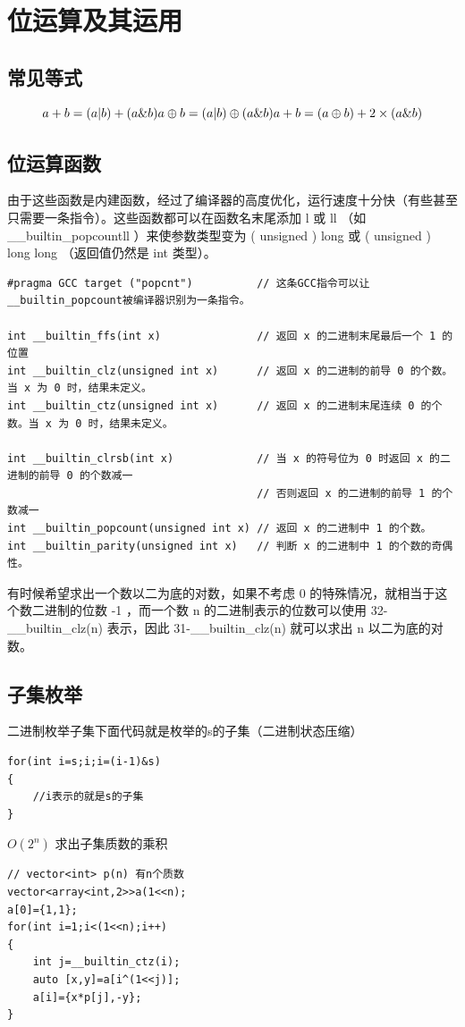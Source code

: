 \section{位运算及其运用}
\subsection{常见等式}
$$
a+b=(a|b)+(a\&b)\\
a\oplus b=(a|b)\oplus(a\&b) \\
a+b=(a\oplus b)+2\times(a\&b) \\
$$
\subsection{位运算函数}

\par 由于这些函数是内建函数，经过了编译器的高度优化，运行速度十分快（有些甚至只需要一条指令）。这些函数都可以在函数名末尾添加 l 或 ll （如 \_\_builtin\_popcountll ）来使参数类型变为 ( unsigned ) long 或 ( unsigned ) long long （返回值仍然是 int 类型）。
\begin{verbatim}
#pragma GCC target ("popcnt")          // 这条GCC指令可以让__builtin_popcount被编译器识别为一条指令。

int __builtin_ffs(int x)               // 返回 x 的二进制末尾最后一个 1 的位置
int __builtin_clz(unsigned int x)      // 返回 x 的二进制的前导 0 的个数。当 x 为 0 时，结果未定义。
int __builtin_ctz(unsigned int x)      // 返回 x 的二进制末尾连续 0 的个数。当 x 为 0 时，结果未定义。

int __builtin_clrsb(int x)             // 当 x 的符号位为 0 时返回 x 的二进制的前导 0 的个数减一
                                       // 否则返回 x 的二进制的前导 1 的个数减一
int __builtin_popcount(unsigned int x) // 返回 x 的二进制中 1 的个数。
int __builtin_parity(unsigned int x)   // 判断 x 的二进制中 1 的个数的奇偶性。
\end{verbatim}

\par 有时候希望求出一个数以二为底的对数，如果不考虑 0 的特殊情况，就相当于这个数二进制的位数 -1 ，而一个数 n 的二进制表示的位数可以使用 32-\_\_builtin\_clz(n) 表示，因此 31-\_\_builtin\_clz(n) 就可以求出 n 以二为底的对数。

\subsection{子集枚举}
\par \noindent 二进制枚举子集下面代码就是枚举的s的子集（二进制状态压缩）
\begin{verbatim}
for(int i=s;i;i=(i-1)&s)
{
    //i表示的就是s的子集
}
\end{verbatim}
\par \noindent $O(2^n)$ 求出子集质数的乘积
\begin{verbatim}
// vector<int> p(n) 有n个质数
vector<array<int,2>>a(1<<n);
a[0]={1,1};
for(int i=1;i<(1<<n);i++)
{
    int j=__builtin_ctz(i);
    auto [x,y]=a[i^(1<<j)];
    a[i]={x*p[j],-y};
}
\end{verbatim}